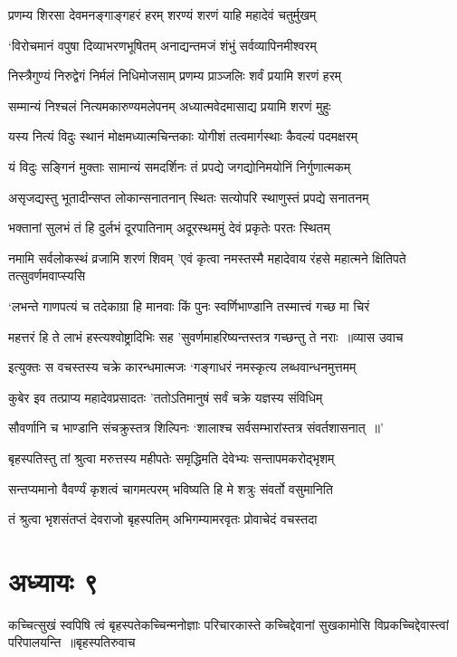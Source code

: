 \twolineshloka
{प्रणम्य शिरसा देवमनङ्गाङ्गहरं हरम्}
{शरण्यं शरणं याहि महादेवं चतुर्मुखम्}


\twolineshloka
{`विरोचमानं वपुषा दिव्याभरणभूषितम्}
{अनाद्यन्तमजं शंभुं सर्वव्यापिनमीश्वरम्}


\twolineshloka
{निस्त्रैगुण्यं निरुद्वेगं निर्मलं निधिमोजसाम्}
{प्रणम्य प्राञ्जलिः शर्वं प्रयामि शरणं हरम्}


\twolineshloka
{सम्मान्यं निश्चलं नित्यमकारुण्यमलेपनम्}
{अध्यात्मवेदमासाद्य प्रयामि शरणं मुहुः}


\twolineshloka
{यस्य नित्यं विदुः स्थानं मोक्षमध्यात्मचिन्तकाः}
{योगीशं तत्वमार्गस्थाः कैवल्यं पदमक्षरम्}


\twolineshloka
{यं विदुः सङ्गिनं मुक्ताः सामान्यं समदर्शिनः}
{तं प्रपद्ये जगद्योनिमयोनिं निर्गुणात्मकम्}


\twolineshloka
{असृजद्यस्तु भूतादीन्सप्त लोकान्सनातनान्}
{स्थितः सत्योपरि स्थाणुस्तं प्रपद्ये सनातनम्}


\twolineshloka
{भक्तानां सुलभं तं हि दुर्लभं दूरपातिनाम्}
{अदूरस्थममुं देवं प्रकृतेः परतः स्थितम्}


\threelineshloka
{नमामि सर्वलोकस्थं व्रजामि शरणं शिवम्}
{'एवं कृत्वा नमस्तस्मै महादेवाय रंहसे}
{महात्मने क्षितिपते तत्सुवर्णमवाप्स्यसि}


\twolineshloka
{`लभन्ते गाणपत्यं च तदेकाग्रा हि मानवाः}
{किं पुनः स्वर्णिभाण्डानि तस्मात्त्वं गच्छ मा चिरं}


\threelineshloka
{महत्तरं हि ते लाभं हस्त्यश्वोष्ट्रादिभिः सह}
{'सुवर्णमाहरिष्यन्तस्तत्र गच्छन्तु ते नराः ॥व्यास उवाच}
{}


\twolineshloka
{इत्युक्तः स वचस्तस्य चक्रे कारन्धमात्मजः}
{`गङ्गाधरं नमस्कृत्य लब्धवान्धनमुत्तमम्}


\twolineshloka
{कुबेर इव तत्प्राप्य महादेवप्रसादतः}
{'ततोऽतिमानुषं सर्वं चक्रे यज्ञस्य संविधिम्}


\twolineshloka
{सौवर्णानि च भाण्डानि संचक्रुस्तत्र शिल्पिनः}
{`शालाश्च सर्वसम्भारांस्तत्र संवर्तशासनात् ॥'}


\twolineshloka
{बृहस्पतिस्तु तां श्रुत्वा मरुत्तस्य महीपतेः}
{समृद्धिमति देवेभ्यः सन्तापमकरोद्भृशम्}


\twolineshloka
{सन्तप्यमानो वैवर्ण्यं कृशत्वं चागमत्परम्}
{भविष्यति हि मे शत्रुः संवर्तो वसुमानिति}


\twolineshloka
{तं श्रुत्वा भृशसंतप्तं देवराजो बृहस्पतिम्}
{अभिगम्यामरवृतः प्रोवाचेदं वचस्तदा}


\chapter{अध्यायः ९}
\threelineshloka
{कच्चित्सुखं स्वपिषि त्वं बृहस्पतेकच्चिन्मनोज्ञाः परिचारकास्ते}
{कच्चिद्देवानां सुखकामोसि विप्रकच्चिद्देवास्त्वां परिपालयन्ति ॥बृहस्पतिरुवाच}
{}


